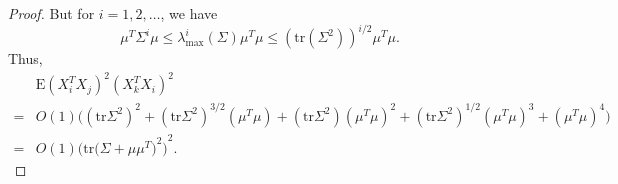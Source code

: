 \documentclass[review]{elsarticle}
\theoremstyle{plain}
\theoremstyle{definition}
\theoremstyle{remark}
\begin{document}
\begin{proof}
    But for $i=1,2,\ldots$, we have
    $$
    \mu^T \Sigma^i \mu
    \leq \lambda_{\max}^i(\Sigma)\mu^T\mu
    \leq {(\mathrm{tr}(\Sigma^2))}^{i/2}\mu^T\mu.
    $$
    Thus,
    \begin{equation}
        \begin{aligned}
            &\mathrm{E}{(X_i^T X_j)}^2{(X_k^T X_i)}^2\\
            =&
            O(1)\big({(\mathrm{tr}\Sigma^2)}^2+
            {(\mathrm{tr}\Sigma^2)}^{3/2}{(\mu^T \mu)}+
            {(\mathrm{tr}\Sigma^2)}{(\mu^T \mu)}^2+
            {(\mathrm{tr}\Sigma^2)}^{1/2}{(\mu^T \mu)}^3+
            {(\mu^T \mu)}^4
            \big)\\
            =& O(1){\Big(\mathrm{tr}{\big(\Sigma+\mu\mu^T\big)}^2\Big)}^2.
        \end{aligned}
    \end{equation}
\end{proof}
\end{document}
